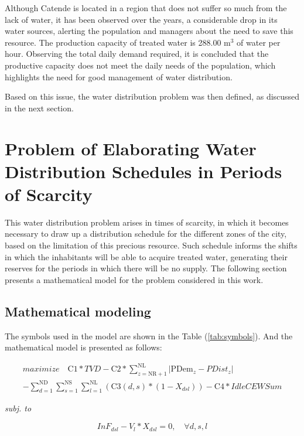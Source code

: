 \documentclass{singlecol}
\theoremstyle{TH}{
\newtheorem{lemma}{Lemma}
\newtheorem{theorem}[lemma]{Theorem}
\newtheorem{corrolary}[lemma]{Corrolary}
\newtheorem{conjecture}[lemma]{Conjecture}
\newtheorem{proposition}[lemma]{Proposition}
\newtheorem{claim}[lemma]{Claim}
\newtheorem{stheorem}[lemma]{Wrong Theorem}
\newtheorem{algorithm}{Algorithm}
}
\theoremstyle{THrm}{
\newtheorem{definition}{Definition}[section]
\newtheorem{question}{Question}[section]
\newtheorem{remark}{Remark}
\newtheorem{scheme}{Scheme}
}
\theoremstyle{THhit}{
\newtheorem{case}{Case}[section]
}
\begin{document}
Although Catende is located in a region that does not suffer so much from the lack of water, it has been observed over the years, a considerable drop in its water sources, alerting the population and managers about the need to save this resource. The production \label{secondChange}{capacity of treated water is 288.00 $\mathrm{m^3}$ of water per hour}. Observing the total daily demand required, it is concluded that the productive capacity does not meet the daily needs of the population, which highlights the need for good management of water distribution.

Based on this issue, the water distribution problem was then defined, as discussed in the next section. 

\section{Problem of Elaborating Water Distribution Schedules in Periods of Scarcity} 
\label{sec:EWDSPSP}

This water distribution problem arises in times of scarcity, in which it becomes necessary to draw up a distribution schedule for the different zones of the city, based on the limitation of this precious resource. Such schedule informs the shifts in which the inhabitants will be able to acquire treated water, generating their reserves for the periods in which there will be no supply. The following section presents a mathematical model for the problem considered in this work.

\subsection{Mathematical modeling}
\label{sec:problemModel}
 
The symbols used in the model are shown in the Table (\ref{tab:symbols}). And the mathematical model is presented as follows:

\begin{eqnarray} 
\label{eq:objFunc}
	 maximize \quad 
	 \mathrm{C1}*TVD 
	 - \mathrm{C2}*\sum_{z=\mathrm{NR}+1}^{\mathrm{NL}}{|\mathrm{PDem}_{z} 
	 - PDist_{z}|} \\ \nonumber 
	- \sum_{d=1}^{\mathrm{ND}}{\sum_{s=1}^{\mathrm{NS}}{\sum_{l=1}^{\mathrm{NL}}{(\mathrm{C3}(d,s)*(1-X_{dsl}))}}} - \mathrm{C4}*IdleCEWSum
\end{eqnarray}

\emph{subj. to}

\begin{equation}
	InF_{dsl} - V_{l} * X_{dsl} = 0, \quad \forall{d, s, l}
	\label{eq:evalInF}
\end{equation}
\end{document}
